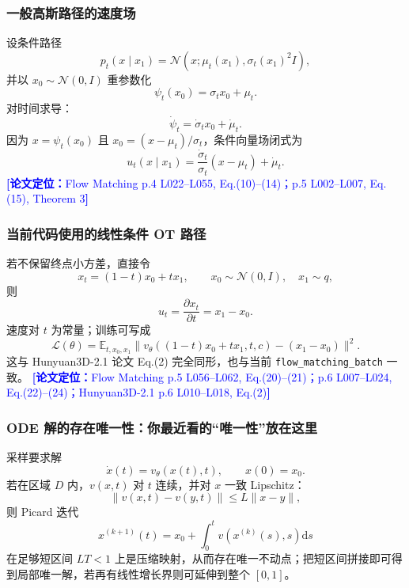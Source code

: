 \documentclass[11pt,a4paper]{ctexart}
\newcommand{\paperref}[1]{\textcolor{Blue}{\footnotesize\textbf{[论文定位：}#1\textbf{]}}}
\newcommand{\E}{\mathbb{E}}
\newcommand{\N}{\mathcal{N}}
\newcommand{\dd}{\mathrm{d}}
\begin{document}
\subsubsection*{一般高斯路径的速度场}

设条件路径
\begin{equation}
p_t(x\mid x_1)=\N(x;\mu_t(x_1),\sigma_t(x_1)^2 I),
\end{equation}
并以 $x_0\sim\N(0,I)$ 重参数化
\begin{equation}
\psi_t(x_0)=\sigma_t x_0+\mu_t.
\end{equation}
对时间求导：
\begin{equation}
\dot\psi_t=\dot\sigma_t x_0+\dot\mu_t.
\end{equation}
因为 $x=\psi_t(x_0)$ 且 $x_0=(x-\mu_t)/\sigma_t$，条件向量场闭式为
\begin{equation}
u_t(x\mid x_1)=\frac{\dot\sigma_t}{\sigma_t}(x-\mu_t)+\dot\mu_t.
\end{equation}
\paperref{Flow Matching p.4 L022--L055, Eq.(10)--(14)；p.5 L002--L007, Eq.(15), Theorem 3}

\subsubsection*{当前代码使用的线性条件 OT 路径}

若不保留终点小方差，直接令
\begin{equation}
x_t=(1-t)x_0+t x_1,\qquad x_0\sim\N(0,I),\quad x_1\sim q,
\end{equation}
则
\begin{equation}
u_t=\frac{\partial x_t}{\partial t}=x_1-x_0.
\end{equation}
速度对 $t$ 为常量；训练可写成
\begin{equation}
\mathcal L(\theta)=\E_{t,x_0,x_1}
\|v_\theta((1-t)x_0+t x_1,t,c)-(x_1-x_0)\|^2.
\label{eq:linearFM}
\end{equation}
这与 Hunyuan3D-2.1 论文 Eq.(2) 完全同形，也与当前 \texttt{flow\_matching\_batch} 一致。
\paperref{Flow Matching p.5 L056--L062, Eq.(20)--(21)；p.6 L007--L024, Eq.(22)--(24)；Hunyuan3D-2.1 p.6 L010--L018, Eq.(2)}

\subsubsection*{ODE 解的存在唯一性：你最近看的“唯一性”放在这里}

采样要求解
\begin{equation}
\dot x(t)=v_\theta(x(t),t),\qquad x(0)=x_0.
\end{equation}
若在区域 $D$ 内，$v(x,t)$ 对 $t$ 连续，并对 $x$ 一致 Lipschitz：
\begin{equation}
\|v(x,t)-v(y,t)\|\le L\|x-y\|,
\end{equation}
则 Picard 迭代
\begin{equation}
x^{(k+1)}(t)=x_0+\int_0^t v(x^{(k)}(s),s)\dd s
\end{equation}
在足够短区间 $LT<1$ 上是压缩映射，从而存在唯一不动点；把短区间拼接即可得到局部唯一解，若再有线性增长界则可延伸到整个 $[0,1]$。
\end{document}

